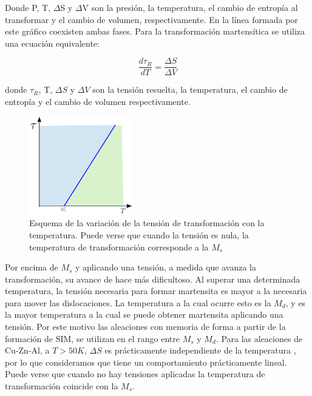 \documentclass[a4paper,12pt,fleqn,twoside,openany]{book}
\begin{document}
Donde P, T, $\Delta$S y $\Delta$V son la presión, la temperatura, el cambio de entropía al transformar y el cambio de volumen, respectivamente. En la línea formada por este gráfico 
coexisten ambas fases. Para la transformación martensítica se utiliza una ecuación equivalente:

\begin{equation}
 \frac{d \tau_{R}}{dT}=\frac{\Delta S}{\Delta V} 
\end{equation}

donde $\tau_{R}$, T, $\Delta S$ y $\Delta V$ son la tensión resuelta, la temperatura, el cambio de entropía y el cambio de volumen respectivamente.






\begin{figure}[h]
 \centering
 \includegraphics[width=0.4\textwidth]{Img/Introduccion/Clapeyron.eps}
 \caption{Esquema de la variación de la tensión de transformación con la temperatura. Puede verse que cuando la tensión es nula, la temperatura de
 transformación corresponde a la $M_s$}
\end{figure}






Por encima de $M_s$ y aplicando una tensión, a medida que avanza la transformación, su avance de hace más dificultoso. Al superar una determinada temperatura, la tensión necesaria para 
formar martensita es mayor a la necesaria para mover las dislocaciones. La temperatura a la cual ocurre esto es la $M_d$, y es la mayor temperatura a la cual se puede 
obtener martensita aplicando una tensión. Por este motivo las aleaciones con memoria de forma a partir de la formación de SIM, se utilizan en el rango entre $M_s$ y $M_d$.
Para las aleaciones de Cu-Zn-Al, a $T > 50K$, $\Delta S$ es prácticamente independiente de la temperatura \cite{pierre}, por lo que consideramos que tiene un comportamiento 
prácticamente lineal. Puede verse que cuando no hay tensiones aplicadas la temperatura de transformación coincide con la $M_s$.
\end{document}
